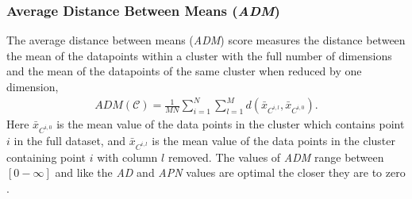 \subsubsection{Average Distance Between Means (\textit{ADM})}
The average  distance between means (\textit{ADM}) score  measures the distance
between  the mean of  the datapoints  within a  cluster with  the full
number  of dimensions  and  the mean  of  the datapoints  of the  same
cluster when reduced by one dimension,
\begin{gather}
ADM(\mathcal{C})= \frac{1}{MN} \sum_{i=1}^{N} \sum_{l=1}^{M}
d(\bar{x}_{C^{i,l}}, \bar{x}_{C^{i,0}}) .
\end{gather}  
Here $\bar{x}_{C^{i,0}}$ is  the mean value of the  data points in the
cluster   which  contains  point   $i$  in   the  full   dataset,  and
$\bar{x}_{C^{i,l}}$  is the  mean  value  of the  data  points in  the
cluster containing point  $i$ with column $l$ removed.   The values of
\textit{ADM} range  between $[0-\infty]$ and like  the \textit{AD} and
\textit{APN}  values   are  optimal  the  closer  they   are  to  zero
\cite{datta2003, brock2008}.






